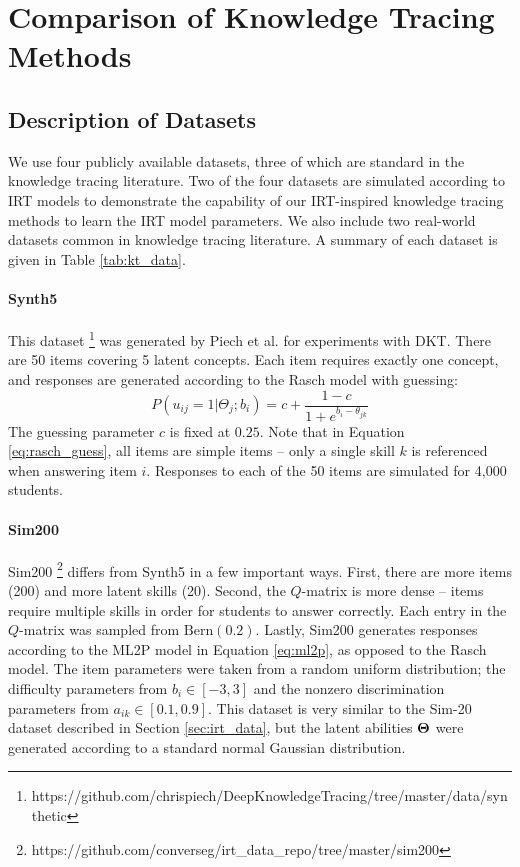 \chapter{Comparison of Knowledge Tracing Methods}

\section{Description of Datasets}\label{sec:kt_data}
We use four publicly available datasets, three of which are standard in the knowledge tracing literature. Two of the four datasets are simulated according to IRT models to demonstrate the capability of our IRT-inspired knowledge tracing methods to learn the IRT model parameters. We also include two real-world datasets common in knowledge tracing literature. A summary of each dataset is given in Table \ref{tab:kt_data}.

\subsubsection*{Synth5}
This dataset \footnote{https://github.com/chrispiech/DeepKnowledgeTracing/tree/master/data/synthetic} was generated by Piech et al. \cite{piech2015} for experiments with DKT. There are 50 items covering 5 latent concepts. Each item requires exactly one concept, and responses are generated according to the Rasch model \cite{lord1968} with guessing: 
\begin{equation}
  P(u_{ij} = 1| \Theta_j; b_i) = c + \frac{1-c}{1 + e^{b_i - \theta_{jk}}}
  \label{eq:rasch_guess}
\end{equation}
The guessing parameter $c$ is fixed at $0.25$. Note that in Equation \ref{eq:rasch_guess}, all items are simple items -- only a single skill $k$ is referenced when answering item $i$. Responses to each of the 50 items are simulated for 4,000 students.

\subsubsection*{Sim200}
Sim200 \footnote{https://github.com/converseg/irt\_data\_repo/tree/master/sim200} differs from Synth5 in a few important ways. First, there are more items (200) and more latent skills (20). Second, the $Q$-matrix is more dense -- items require multiple skills in order for students to answer correctly. Each entry in the $Q$-matrix was sampled from $\text{Bern}(0.2)$. Lastly, Sim200 generates responses according to the ML2P model in Equation \ref{eq:ml2p}, as opposed to the Rasch model. The item parameters were taken from a random uniform distribution; the difficulty parameters from $b_i \in [-3,3]$ and the nonzero discrimination parameters from $a_{ik} \in [0.1,0.9]$. This dataset is very similar to the Sim-20 dataset described in Section \ref{sec:irt_data}, but the latent abilities $\boldsymbol{\Theta}$ were generated according to a standard normal Gaussian distribution.


